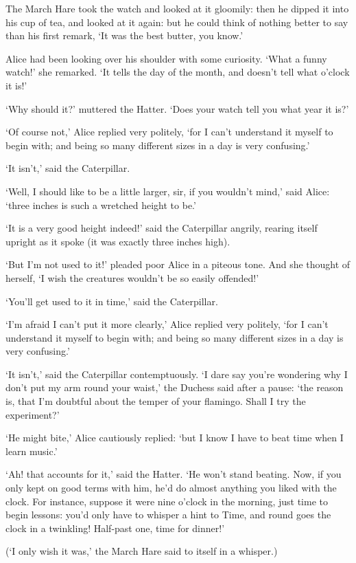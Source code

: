 \documentclass[statementpaper,twoside,openany]{memoir}
\begin{document}
The March Hare took the watch and looked at it gloomily: then he dipped it into his cup of tea, and looked at it again: but he could think of nothing better to say than his first remark, `It was the best butter, you know.'

Alice had been looking over his shoulder with some curiosity. `What a funny watch!' she remarked. `It tells the day of the month, and doesn't tell what o'clock it is!'

`Why should it?' muttered the Hatter. `Does your watch tell you what year it is?'

`Of course not,' Alice replied very politely, `for I can't understand it myself to begin with; and being so many different sizes in a day is very confusing.'

`It isn't,' said the Caterpillar.

`Well, I should like to be a little larger, sir, if you wouldn't mind,' said Alice: `three inches is such a wretched height to be.'

`It is a very good height indeed!' said the Caterpillar angrily, rearing itself upright as it spoke (it was exactly three inches high).

`But I'm not used to it!' pleaded poor Alice in a piteous tone. And she thought of herself, `I wish the creatures wouldn't be so easily offended!'

`You'll get used to it in time,' said the Caterpillar.

`I'm afraid I can't put it more clearly,' Alice replied very politely, `for I can't understand it myself to begin with; and being so many different sizes in a day is very confusing.'

`It isn't,' said the Caterpillar contemptuously. `I dare say you're wondering why I don't put my arm round your waist,' the Duchess said after a pause: `the reason is, that I'm doubtful about the temper of your flamingo. Shall I try the experiment?'

`He might bite,' Alice cautiously replied: `but I know I have to beat time when I learn music.'

`Ah! that accounts for it,' said the Hatter. `He won't stand beating. Now, if you only kept on good terms with him, he'd do almost anything you liked with the clock. For instance, suppose it were nine o'clock in the morning, just time to begin lessons: you'd only have to whisper a hint to Time, and round goes the clock in a twinkling! Half-past one, time for dinner!'

(`I only wish it was,' the March Hare said to itself in a whisper.)
\end{document}
